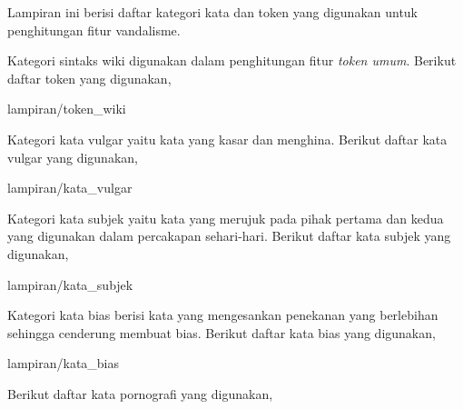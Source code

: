 \vspace*{\fill}
\begin{center}
	\begin{minipage}{\textwidth}
		\centering
		\textbf{\Large\tUpLampiran}
	\end{minipage}
\end{center}
\vfill

	\label{lampiran:daftar_token_dan_kata}

Lampiran ini berisi daftar kategori kata dan token yang digunakan untuk
penghitungan fitur vandalisme.

	\label{lampiran:words_wiki_token}

Kategori sintaks wiki digunakan dalam penghitungan fitur \textit{token umum}.
Berikut daftar token yang digunakan,

	
		{lampiran/token_wiki}

\label{lampiran:words_vulgar}

Kategori kata vulgar yaitu kata yang kasar dan menghina.
Berikut daftar kata vulgar yang digunakan,

	
		{lampiran/kata_vulgar}

\label{lampiran:words_pronoun}

Kategori kata subjek yaitu kata yang merujuk pada pihak pertama dan kedua yang
digunakan dalam percakapan sehari-hari.
Berikut daftar kata subjek yang digunakan,

	
		{lampiran/kata_subjek}

\label{lampiran:words_bias}

Kategori kata bias berisi kata yang mengesankan penekanan yang berlebihan
sehingga cenderung membuat bias.
Berikut daftar kata bias yang digunakan,

	
		{lampiran/kata_bias}

\label{lampiran:words_sex}

Berikut daftar kata pornografi yang digunakan,

